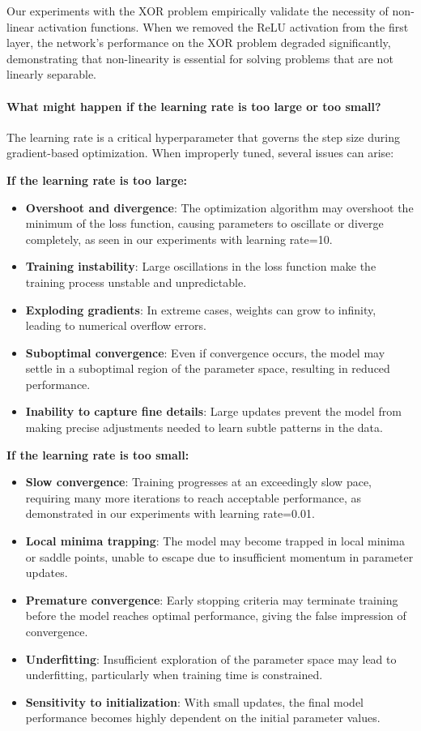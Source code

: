 \documentclass[twocolumn]{extarticle}
\begin{document}
Our experiments with the XOR problem empirically validate the necessity of non-linear activation functions. When we removed the ReLU activation from the first layer, the network's performance on the XOR problem degraded significantly, demonstrating that non-linearity is essential for solving problems that are not linearly separable.

\paragraph{What might happen if the learning rate is too large or too small?}
The learning rate is a critical hyperparameter that governs the step size during gradient-based optimization. When improperly tuned, several issues can arise:

\textbf{If the learning rate is too large:}
\begin{itemize}
    \item \textbf{Overshoot and divergence}: The optimization algorithm may overshoot the minimum of the loss function, causing parameters to oscillate or diverge completely, as seen in our experiments with learning rate=10.
    \item \textbf{Training instability}: Large oscillations in the loss function make the training process unstable and unpredictable.
    \item \textbf{Exploding gradients}: In extreme cases, weights can grow to infinity, leading to numerical overflow errors.
    \item \textbf{Suboptimal convergence}: Even if convergence occurs, the model may settle in a suboptimal region of the parameter space, resulting in reduced performance.
    \item \textbf{Inability to capture fine details}: Large updates prevent the model from making precise adjustments needed to learn subtle patterns in the data.
\end{itemize}

\textbf{If the learning rate is too small:}
\begin{itemize}
    \item \textbf{Slow convergence}: Training progresses at an exceedingly slow pace, requiring many more iterations to reach acceptable performance, as demonstrated in our experiments with learning rate=0.01.
    \item \textbf{Local minima trapping}: The model may become trapped in local minima or saddle points, unable to escape due to insufficient momentum in parameter updates.
    \item \textbf{Premature convergence}: Early stopping criteria may terminate training before the model reaches optimal performance, giving the false impression of convergence.
    \item \textbf{Underfitting}: Insufficient exploration of the parameter space may lead to underfitting, particularly when training time is constrained.
    \item \textbf{Sensitivity to initialization}: With small updates, the final model performance becomes highly dependent on the initial parameter values.
\end{itemize}
\end{document}
